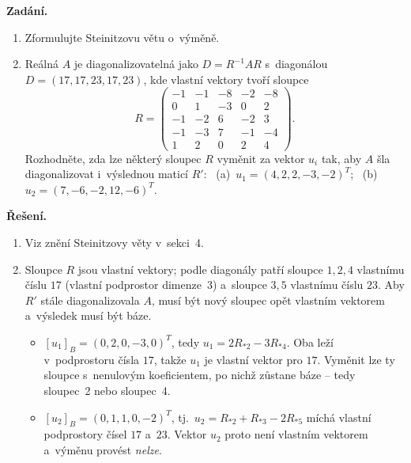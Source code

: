 \documentclass[11pt,a4paper]{article}
\begin{document}
\begin{priklad} \par
\textbf{Zadání.}
\begin{enumerate}[label=(\arabic*)]
  \item Zformulujte Steinitzovu větu o~výměně.
  \item Reálná $A$ je diagonalizovatelná jako $D=R^{-1}AR$ s~diagonálou $D=(17,17,23,17,23)$, kde vlastní vektory tvoří sloupce
    \[
      R=\begin{pmatrix}
        -1 & -1 & -8 & -2 & -8\\
        0 & 1 & -3 & 0 & 2\\
        -1 & -2 & 6 & -2 & 3\\
        -1 & -3 & 7 & -1 & -4\\
        1 & 2 & 0 & 2 & 4
      \end{pmatrix}.
    \]
    Rozhodněte, zda lze některý sloupec $R$ vyměnit za vektor $u_i$ tak, aby $A$ šla diagonalizovat i~výslednou maticí $R'$: \ (a)~$u_1=(4,2,2,-3,-2)^T$; \ (b)~$u_2=(7,-6,-2,12,-6)^T$.
\end{enumerate}

\textbf{Řešení.}
\begin{enumerate}[label=(\arabic*)]
  \item Viz znění Steinitzovy věty v~sekci~4.
  \item Sloupce $R$ jsou vlastní vektory; podle diagonály patří sloupce $1,2,4$ vlastnímu číslu $17$ (vlastní podprostor dimenze~3) a~sloupce $3,5$ vlastnímu číslu $23$. Aby $R'$ stále diagonalizovala $A$, musí být nový sloupec opět vlastním vektorem a~výsledek musí být báze.
    \begin{itemize}
      \item[(a)] $[u_1]_B=(0,2,0,-3,0)^T$, tedy $u_1=2R_{*2}-3R_{*4}$. Oba leží v~podprostoru čísla $17$, takže $u_1$ je vlastní vektor pro $17$. Vyměnit lze ty sloupce s~nenulovým koeficientem, po nichž zůstane báze -- tedy sloupec~2 nebo sloupec~4.
      \item[(b)] $[u_2]_B=(0,1,1,0,-2)^T$, tj.\ $u_2=R_{*2}+R_{*3}-2R_{*5}$ míchá vlastní podprostory čísel $17$ a~$23$. Vektor $u_2$ proto není vlastním vektorem a~výměnu provést \emph{nelze}.
    \end{itemize}
\end{enumerate}
\end{priklad}

\end{document}
